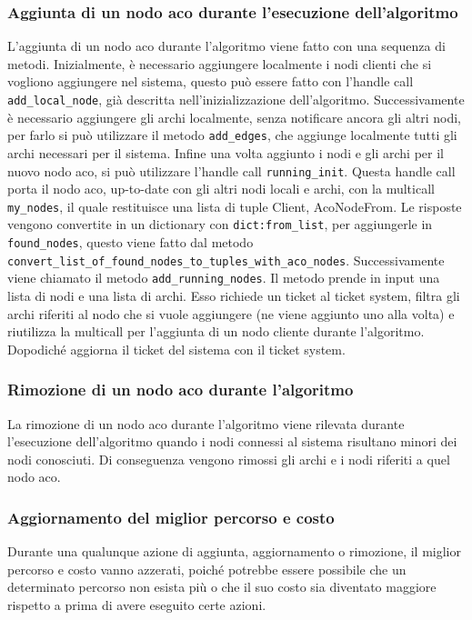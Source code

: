 \subsubsection{Aggiunta di un nodo aco durante l'esecuzione dell'algoritmo}
L'aggiunta di un nodo aco durante l'algoritmo viene fatto con una sequenza di metodi.
Inizialmente, è necessario aggiungere localmente i nodi clienti che si vogliono aggiungere nel sistema, questo può essere fatto con l'handle call \texttt{add\_local\_node}, già descritta nell'inizializzazione dell'algoritmo. Successivamente è necessario aggiungere gli archi localmente, senza notificare ancora gli altri nodi, per farlo si può utilizzare il metodo \texttt{add\_edges}, che aggiunge localmente tutti gli archi necessari per il sistema.
Infine una volta aggiunto i nodi e gli archi per il nuovo nodo aco, si può utilizzare l'handle call \texttt{running\_init}. Questa handle call porta il nodo aco, up-to-date con gli altri nodi locali e archi, con la multicall \texttt{my\_nodes}, il quale restituisce una lista di tuple {Client, AcoNodeFrom}.
Le risposte vengono convertite in un dictionary con \texttt{dict:from\_list}, per aggiungerle in \texttt{found\_nodes}, questo viene fatto dal metodo \texttt{convert\_list\_of\_found\_nodes\_to\_tuples\_with\_aco\_nodes}.
Successivamente viene chiamato il metodo \texttt{add\_running\_nodes}. Il metodo prende in input una lista di nodi e una lista di archi.
Esso richiede un ticket al ticket system, filtra gli archi riferiti al nodo che si vuole aggiungere (ne viene aggiunto uno alla volta) e riutilizza la multicall per l'aggiunta di un nodo cliente durante l'algoritmo.
Dopodiché aggiorna il ticket del sistema con il ticket system.

\subsubsection{Rimozione di un nodo aco durante l'algoritmo}
La rimozione di un nodo aco durante l'algoritmo viene rilevata durante l'esecuzione dell'algoritmo quando i nodi connessi al sistema risultano minori dei nodi conosciuti.
Di conseguenza vengono rimossi gli archi e i nodi riferiti a quel nodo aco.

\subsubsection{Aggiornamento del miglior percorso e costo}
Durante una qualunque azione di aggiunta, aggiornamento o rimozione, il miglior percorso e costo vanno azzerati, poiché potrebbe essere possibile che un determinato percorso non esista più o che il suo costo sia diventato maggiore rispetto a prima di avere eseguito certe azioni.

